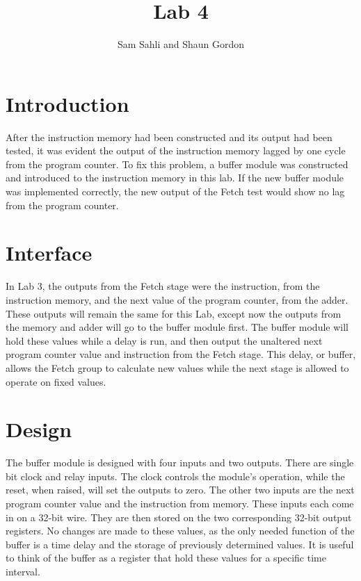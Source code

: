 \documentclass{article}
\author{Sam Sahli and Shaun Gordon}
\title{Lab 4}
\begin{document}
\maketitle

\section{Introduction}
After the instruction memory had been constructed and its output had been tested, it was evident the output of the instruction memory lagged by one cycle from the program counter. To fix this problem, a buffer module was constructed and introduced to the instruction memory in this lab. If the new buffer module was implemented correctly, the new output of the Fetch test would show no lag from the program counter.

\section{Interface}
In Lab 3, the outputs from the Fetch stage were the instruction, from the instruction memory, and the next value of the program counter, from the adder. These outputs will remain the same for this Lab, except now the outputs from the memory and adder will go to the buffer module first. The buffer module will hold these values while a delay is run, and then output the unaltered next program counter value and instruction from the Fetch stage. This delay, or buffer, allows the Fetch group to calculate new values while the next stage is allowed to operate on fixed values. 

\section{Design}
The buffer module is designed with four inputs and two outputs. There are single bit clock and relay inputs. The clock controls the module's operation, while the reset, when raised, will set the outputs to zero. The other two inputs are the next program counter value and the instruction from memory. These inputs each come in on a 32-bit wire. They are then stored on the two corresponding 32-bit output registers. No changes are made to these values, as the only needed function of the buffer is a time delay and the storage of previously determined values. It is useful to think of the buffer as a register that hold these values for a specific time interval.
\end{document}
